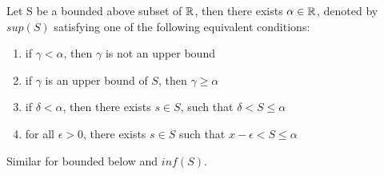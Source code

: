 \documentclass {article}
\begin{document}
	\begin {Theorem}
		Let S be a bounded above subset of $\Bbb R$, then there exists $\alpha \in \Bbb R$, denoted by $sup (S)$ satisfying one of the following equivalent conditions:
		\begin {enumerate}
			\item {if $\gamma < \alpha$, then $\gamma$ is not an upper bound}
			\item {if $\gamma$ is an upper bound of $S$, then $\gamma \geq \alpha$}
			\item {if $\delta < \alpha$, then there exists $s \in S$, such that $\delta < S \leq \alpha$}
			\item {for all $\epsilon > 0$, there exists $s\in S$ such that $x-\epsilon < S \leq \alpha$}
		\end {enumerate}
		Similar for bounded below and $inf (S)$.
	\end {Theorem}

	\begin {29}
		
	\end {29}
\end{document}
